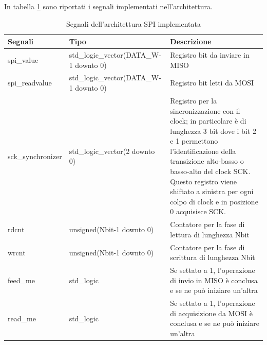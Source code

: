 \documentclass[titlepage]{report}
\begin{document}
			In tabella \ref{tab:spi_signals} sono riportati i segnali implementati nell'architettura.
			\begin{table}[H]
				\begin{tabular}{|l|l|p{}|}
					\hline
					\textbf{Segnali} & \textbf{Tipo} & \textbf{Descrizione} \\
					\hline
					spi\_value & std\_logic\_vector(DATA\_W-1 downto 0) & Registro bit da inviare in MISO \\
					spi\_readvalue & std\_logic\_vector(DATA\_W-1 downto 0) & Registro bit letti da MOSI \\
					sck\_synchronizer & std\_logic\_vector(2 downto 0) & Registro per la sincronizzazione con il clock; in particolare è di lunghezza 3 bit dove i bit 2 e 1 permettono l'identificazione della transizione alto-basso o basso-alto del clock SCK. Questo registro viene shiftato a sinistra per ogni colpo di clock e in posizione 0 acquisisce SCK. \\
					rdcnt & unsigned(Nbit-1 downto 0) & Contatore per la fase di lettura di lunghezza Nbit \\
					wrcnt & unsigned(Nbit-1 downto 0) & Contatore per la fase di scrittura di lunghezza Nbit \\
					feed\_me & std\_logic & Se settato a 1, l'operazione di invio in MISO è conclusa e se ne può iniziare un'altra \\
					read\_me & std\_logic & Se settato a 1, l'operazione di acquisizione da MOSI è conclusa e se ne può iniziare un'altra \\
					\hline
				\end{tabular}
				\caption{Segnali dell'architettura SPI implementata}
				\label{tab:spi_signals}
			\end{table}
\end{document}
